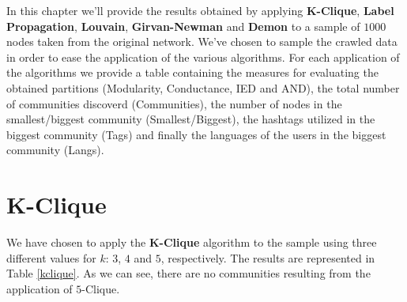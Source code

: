 In this chapter we'll provide the results obtained by applying \textbf{K-Clique}, \textbf{Label Propagation},
\textbf{Louvain}, \textbf{Girvan-Newman} and \textbf{Demon} to a sample of $1000$ nodes taken from the original
network. We've chosen to sample the crawled data in order to ease the application of the various algorithms.
For each application of the algorithms we provide a table containing the measures for evaluating the obtained
partitions (Modularity, Conductance, IED and AND), the total number of communities discoverd
(Communities), the number of nodes in the smallest/biggest community (Smallest/Biggest), the hashtags utilized
in the biggest community (Tags) and finally the languages of the users in the biggest community (Langs).

\section{K-Clique} %
\label{sec:k_clique}
    We have chosen to apply the \textbf{K-Clique} algorithm to the sample using three different values for
    $k$: $3$, $4$ and $5$, respectively. The results are represented in Table \ref{kclique}. As we can see, there are
    no communities resulting from the application of $5$-Clique.

    \begin{table}[H]
        \centering
        \begin{subtable}{\textwidth}
        \end{subtable}
        \caption{Evaluation of the partitions obtained by the application of the K-Clique algorithm.}
        \label{kclique}
    \end{table}

